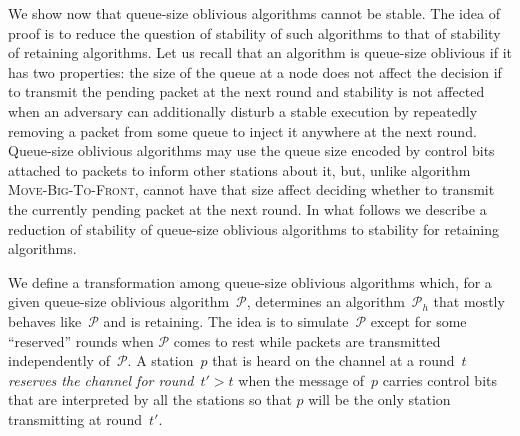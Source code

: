 \documentclass[11pt]{article}
\newcommand{\cP}{\mathcal{P}}
\begin{document}
We show now that queue-size oblivious algorithms cannot be stable.
The idea of proof is to reduce the question of stability of such algorithms to that of stability of retaining algorithms.
Let us recall that an algorithm is queue-size oblivious if it has two properties: the size of the queue at a node does not affect the decision if to transmit the pending packet at the next round and stability is not affected when an adversary can additionally disturb a stable execution by repeatedly removing a packet from some queue to inject it anywhere at the next round.
Queue-size oblivious algorithms may use the queue size encoded by control bits attached to packets to inform other stations about it, but, unlike algorithm \textsc{Move-Big-To-Front}, cannot have that size affect deciding whether to transmit the currently pending packet at the next round.
In what follows we describe a reduction of stability of queue-size oblivious algorithms to stability for retaining algorithms.

We define a transformation among queue-size oblivious algorithms which, for a given queue-size oblivious algorithm~$\cP$, determines an algorithm~$\cP_h$ that mostly behaves like~$\cP$ and is retaining.
The idea is to simulate~$\cP$ except for some ``reserved'' rounds when $\cP$ comes to rest while packets are transmitted independently of~$\cP$.
A station~$p$ that is heard on the channel at a round~$t$ \emph{reserves the channel for round~$t'>t$} when the message of~$p$ carries control bits that are interpreted by all the stations so that $p$ will be the only station transmitting at round~$t'$.
\end{document}
